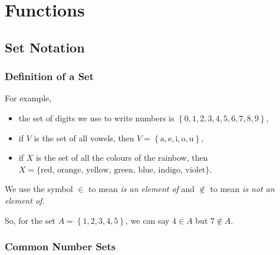 \documentclass[11pt,a4paper]{book}
\begin{document}
\tableofcontents
\chapter{Functions}

\section[Set Notation (O-Level Revision)]{Set Notation}

\subsection{Definition of a Set}
\begin{center}
\par\end{center}

For example,
\begin{itemize}
\item the set of digits we use to write numbers is $\left\{ 0,1,2,3,4,5,6,7,8,9\right\} $,
\item if $V$ is the set of all vowels, then $V=\left\{ \text{a},\text{e},\text{i},\text{o},\text{u}\right\} $,
\item if $X$ is the set of all the colours of the rainbow, then $X=\{\text{red, orange, yellow, green, blue, indigo, violet}\}$.
\end{itemize}
\begin{center}
\par\end{center}

We use the symbol $\in$ to mean \textit{is an element of }and $\not\in$
to mean \textit{is not an element of.}

So, for the set $A=\left\{ 1,2,3,4,5\right\} $, we can say $4\in A$
but $7\not\in A$.
\begin{center}
\par\end{center}

\subsection{Common Number Sets}
\end{document}
